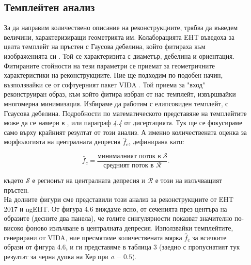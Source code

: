\documentclass[12pt]{article}
\numberwithin{equation}{section}
\numberwithin{figure}{section}
\begin{document}
	
	\subsection{Темплейтен анализ}

	За да направим количествено описание на реконструкциите, трябва да въведем величини, характеризиращи геометрията им. Колаборацията EHT въведоха за целта темплейт на пръстен с Гаусова дебелина, който фитираха към изображенията си \cite{EHT_M87_VI}. Той се характеризита с диаметър, дебелина и ориентация. Фитираните стойности на тези параметри се приемат за геометричните характеристики на реконструкциите. Ние ще подходим по подобен начин, възползвайки се от софтуерният пакет VIDA \cite{VIDA}. Той приема за "вход"$\,$ реконструиран образ, към който фитира избран от нас темплейт, извършвайки многомерна минимизация. Избираме да работим с елипсовиден темплейт, с Гсаусова дебелина. Подробности по математическото представяне на темплейтите може да се намери в \cite{VIDA}, или параграф \emph{4.4} от дисертацията. Тук ще се фокусираме само върху крайният резултат от този анализ. А именно количествената оценка за морфологията на централната депресия $\hat{f}_c$, дефинирана като:
	
	\begin{equation}
		\hat{f}_c = \frac{\text{минималният поток в }\mathcal{S}}{\text{средният поток в }\mathcal{R}}.
	\end{equation}
	
	където $\mathcal{S}$ е регионът на централната депресия и $\mathcal{R}$ е този на излъчващият пръстен.\\
	
	 \noindent На долните фигури сме представили този анализ за реконструкциите от EHT 2017 и ngEHT. От фигура 4.6 виждаме ясно, от сеченията през центъра на образите (десните два панела), че голите сингулярности показват значително по-високо фоново излъчване в централната депресия. Използвайки темплейтите, генерирани от VIDA, ние пресмятаме количествената мярка $\hat{f}_c$ за всичките образи от фигура 4.6, и ги представяме в таблица 3 (заедно с пропуснатият тук резултат за черна дупка на Кер при $a = 0.5$).
	 
\end{document}
